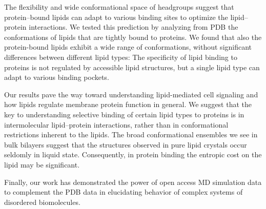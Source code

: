 \documentclass[aps,prl,superscriptaddress,twocolumn]{revtex4}
\begin{document}
The flexibility and wide conformational space of headgroups suggest that protein--bound lipids can
adapt to various binding sites to optimize the lipid--protein interactions.
We tested this prediction by analyzing from PDB the conformations of lipids that are tightly bound to proteins.
We found that also the protein-bound lipids exhibit a wide range of conformations, without significant 
differences between different lipid types: The specificity of lipid binding to proteins is not
regulated by accessible lipid structures, but a single lipid type can adapt to various binding pockets.

Our results pave the way toward understanding lipid-mediated cell signaling and how lipids regulate membrane protein function in general.
We suggest that the key to understanding selective binding of certain lipid types to proteins is in intermolecular lipid--protein interactions, rather than in conformational restrictions inherent to the lipids. The broad conformational ensembles we see in bulk bilayers suggest that the structures observed in pure lipid crystals occur seldomly in liquid state. Consequently, in protein binding the entropic cost on the lipid may be significant.

Finally, our work has demonstrated the power of open access MD simulation data
to complement the PDB data in elucidating behavior of complex systems of disordered biomolecules.
\end{document}

